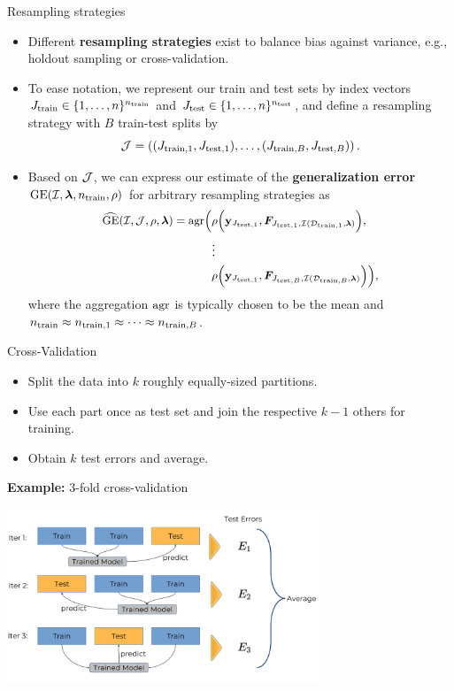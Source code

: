 \begin{vbframe}{Resampling strategies}
\footnotesize
\begin{itemize}
  \item Different \textbf{resampling strategies} exist to balance bias against 
  variance, e.g., holdout sampling or cross-validation.
  \item To ease notation, we represent our train and test sets by index
  vectors $\Jtrain \in \nset^{\ntrain}$ and $\Jtest
  \in \nset^{\ntest}$, and define a resampling strategy with 
  $B$ train-test splits by $$\JJ = \JJset.$$
  \item Based on $\JJ$, we can express our estimate of the \textbf{generalization error} 
 $\GEfull$ for arbitrary resampling strategies as
\begin{equation*}
\small
\begin{split}
\GEhresa = \agr\Big(
 &\rho\Big(\yv_{\Jtesti[1]}, \FJtestftraini[1]\Big), \\ &\large{\vdots} \\
& \rho\Big(\yv_{\Jtesti[1]}, \FJtestftraini[B]\Big)
    \Big),
\end{split}
\end{equation*}
  where the aggregation $\agr$ is typically chosen to 
  be the mean and $\ntrain \approx \ntraini[1] \approx \dots \approx \ntraini[B]$.
\end{itemize}

\end{vbframe}


\begin{vbframe}{Cross-Validation}

\begin{itemize}
  \item Split the data into $k$ roughly equally-sized partitions.
  \item Use each part once as test set and join the respective $k-1$ others for 
  training.
  \item Obtain $k$ test errors and average.
\end{itemize}

\lz

\textbf{Example:} 3-fold cross-validation

\begin{center}
\includegraphics[width=0.7\textwidth]{figure_man/crossvalidation.png}
\end{center}
\end{vbframe}

